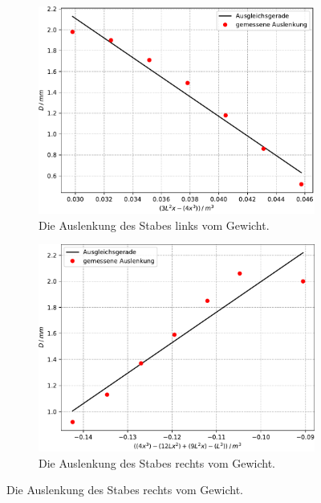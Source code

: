 \begin{figure}
    \centering
    \caption{Beidseitige Einspannung des runden Stabes.}
    \begin{subfigure}{0.4\textwidth} 
       \includegraphics[scale=0.4]{content/data/plot_beidseitig_rund_links.pdf}
       \caption{Die Auslenkung des Stabes links vom Gewicht.}
       \label{fig:beid_links_rund}
    \end{subfigure}

    \begin{subfigure}{0.4\textwidth}
        \includegraphics[scale=0.4]{content/data/plot_beidseitig_rund_rechts.pdf}
        \caption{Die Auslenkung des Stabes rechts vom Gewicht.}
        \label{fig:beid_rechts_rund}
    \end{subfigure}
    \label{fig:beid_rund}
\end{figure}

